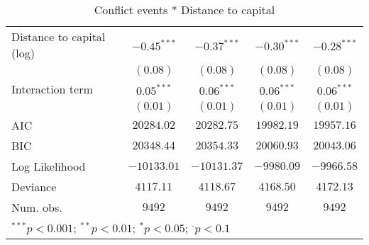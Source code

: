 \begin{sidewaystable}
\begin{center}
{\begin{tabular}{l c c c c}
Distance to capital (log)                & $-0.45^{***}$ & $-0.37^{***}$ & $-0.30^{***}$ & $-0.28^{***}$ \\
                                         & $(0.08)$      & $(0.08)$      & $(0.08)$      & $(0.08)$      \\
Interaction term                         & $0.05^{***}$  & $0.06^{***}$  & $0.06^{***}$  & $0.06^{***}$  \\
                                         & $(0.01)$      & $(0.01)$      & $(0.01)$      & $(0.01)$      \\
\midrule
AIC                                      & $20284.02$    & $20282.75$    & $19982.19$    & $19957.16$    \\
BIC                                      & $20348.44$    & $20354.33$    & $20060.93$    & $20043.06$    \\
Log Likelihood                           & $-10133.01$   & $-10131.37$   & $-9980.09$    & $-9966.58$    \\
Deviance                                 & $4117.11$     & $4118.67$     & $4168.50$     & $4172.13$     \\
Num. obs.                                & $9492$        & $9492$        & $9492$        & $9492$        \\
\bottomrule
\multicolumn{5}{l}{\scriptsize{$^{***}p<0.001$; $^{**}p<0.01$; $^{*}p<0.05$; $^{\cdot}p<0.1$}}
\end{tabular}
}
\caption{Conflict events *
		  Distance to capital}
\label{interaction_state_based}
\end{center}
\end{sidewaystable}
